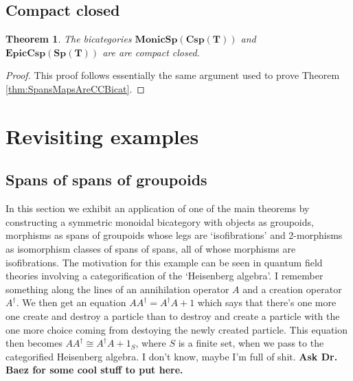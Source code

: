 \documentclass[11pt]{amsart}
\newcommand{\bimonspcsp}[1]{\mathbf{MonicSp(Csp(#1))}}
\newcommand{\biepiccspsp}[1]{\mathbf{EpicCsp(Sp(#1))}}
\newtheorem{thm}{Theorem}[section]
\theoremstyle{remark}
\theoremstyle{definition}
\begin{document}
\subsection{Compact closed} %
\label{subsec.SpansCospansAreCCBicats}

\begin{thm}
	\label{thm:SpansCospansAreCCBicat}
	The bicategories $\bimonspcsp{T}$ and $\biepiccspsp{T}$ are are compact closed.
\end{thm}

\begin{proof}
	This proof follows essentially the same argument used to prove Theorem \ref{thm:SpansMapsAreCCBicat}.
\end{proof}

\section{Revisiting examples} %
\label{sec:RevisitExs}

\subsection{Spans of spans of groupoids} %
\label{subsec:SpanSpanGroupoid}

In this section we exhibit an application of one of the main theorems by constructing a symmetric monoidal bicategory with objects as groupoids, morphisms as spans of groupoids whose legs are `isofibrations' and 2-morphisms as isomorphism classes of spans of spans, all of whose morphisms are isofibrations. The motivation for this example can be seen in quantum field theories involving a categorification of the `Heisenberg algebra'. I remember something along the lines of an annihilation operator $A$ and a creation operator $A^\dagger$. We then get an equation $AA^\dagger = A^\dagger A+1$ which says that there's one more one create and destroy a particle than to destroy and create a particle with the one more choice coming from destoying the newly created particle. This equation then becomes $AA^\dagger \cong A^\dagger A + 1_{S}$, where $S$ is a finite set, when we pass to the categorified Heisenberg algebra. I don't know, maybe I'm full of shit. \textbf{Ask Dr. Baez for some cool stuff to put here.} 
\end{document}
